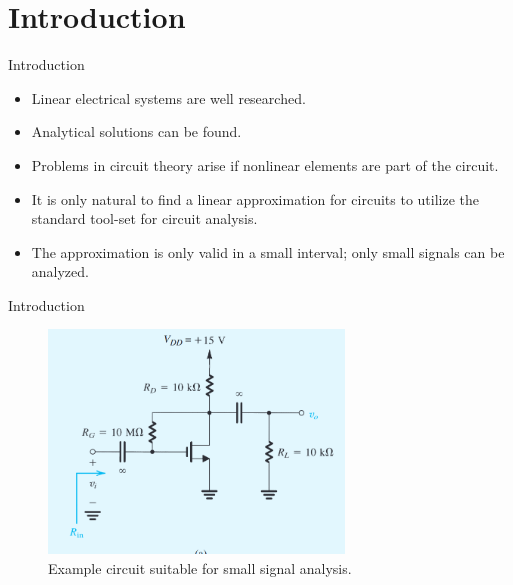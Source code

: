 \section{Introduction}
\begin{frame}{Introduction}
	\begin{itemize}
		\item Linear electrical systems are well researched.
		\item Analytical solutions can be found.
		\item Problems in circuit theory arise if nonlinear elements are part of the circuit.
		\item It is only natural to find a linear approximation for circuits to utilize the standard
		tool-set for circuit analysis.
		\item The approximation is only valid in a small interval; only small signals can be 
		analyzed.
	\end{itemize}
\end{frame}
\begin{frame}{Introduction}
	\begin{figure}
		\centering
		\includegraphics[width=0.7\textwidth]{../assets/example_circuit.png}
		\caption{Example circuit suitable for small signal analysis.}
		\label{fig:example_circuit}
	\end{figure}
\end{frame}